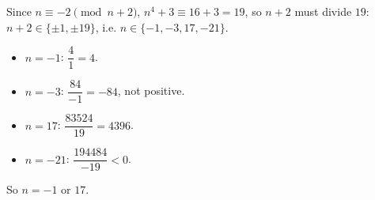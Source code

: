 Since $n\equiv-2\pmod{n+2}$, $n^4+3\equiv16+3=19$, so $n+2$ must divide $19$: $n+2\in\{\pm1,\pm19\}$, i.e. $n\in\{-1,-3,17,-21\}$.
\begin{itemize}
\item $n=-1$: $\dfrac{4}{1}=4$. \checkmark
\item $n=-3$: $\dfrac{84}{-1}=-84$, not positive.
\item $n=17$: $\dfrac{83524}{19}=4396$. \checkmark
\item $n=-21$: $\dfrac{194484}{-19}<0$.
\end{itemize}
So $n=\boxed{-1\text{ or }17}$.

